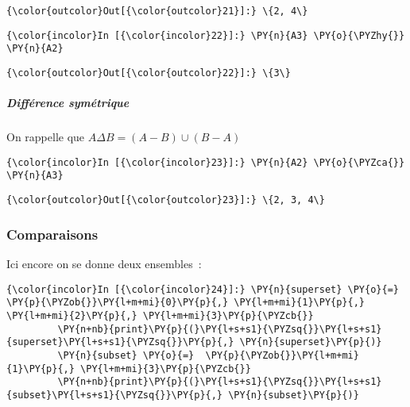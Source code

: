 \begin{Verbatim}[commandchars=\\\{\}]
{\color{outcolor}Out[{\color{outcolor}21}]:} \{2, 4\}
\end{Verbatim}
            
    \begin{Verbatim}[commandchars=\\\{\}]
{\color{incolor}In [{\color{incolor}22}]:} \PY{n}{A3} \PY{o}{\PYZhy{}} \PY{n}{A2}
\end{Verbatim}


\begin{Verbatim}[commandchars=\\\{\}]
{\color{outcolor}Out[{\color{outcolor}22}]:} \{3\}
\end{Verbatim}
            
    \hypertarget{diffuxe9rence-symuxe9trique}{%
\subparagraph{Différence symétrique}\label{diffuxe9rence-symuxe9trique}}

    On rappelle que \(A \Delta B = (A - B) \cup (B - A)\)

    \begin{Verbatim}[commandchars=\\\{\}]
{\color{incolor}In [{\color{incolor}23}]:} \PY{n}{A2} \PY{o}{\PYZca{}} \PY{n}{A3}
\end{Verbatim}


\begin{Verbatim}[commandchars=\\\{\}]
{\color{outcolor}Out[{\color{outcolor}23}]:} \{2, 3, 4\}
\end{Verbatim}
            
    \hypertarget{comparaisons}{%
\subsubsection{Comparaisons}\label{comparaisons}}

    Ici encore on se donne deux ensembles~:

    \begin{Verbatim}[commandchars=\\\{\}]
{\color{incolor}In [{\color{incolor}24}]:} \PY{n}{superset} \PY{o}{=} \PY{p}{\PYZob{}}\PY{l+m+mi}{0}\PY{p}{,} \PY{l+m+mi}{1}\PY{p}{,} \PY{l+m+mi}{2}\PY{p}{,} \PY{l+m+mi}{3}\PY{p}{\PYZcb{}}
         \PY{n+nb}{print}\PY{p}{(}\PY{l+s+s1}{\PYZsq{}}\PY{l+s+s1}{superset}\PY{l+s+s1}{\PYZsq{}}\PY{p}{,} \PY{n}{superset}\PY{p}{)}
         \PY{n}{subset} \PY{o}{=}  \PY{p}{\PYZob{}}\PY{l+m+mi}{1}\PY{p}{,} \PY{l+m+mi}{3}\PY{p}{\PYZcb{}}
         \PY{n+nb}{print}\PY{p}{(}\PY{l+s+s1}{\PYZsq{}}\PY{l+s+s1}{subset}\PY{l+s+s1}{\PYZsq{}}\PY{p}{,} \PY{n}{subset}\PY{p}{)}
\end{Verbatim}



